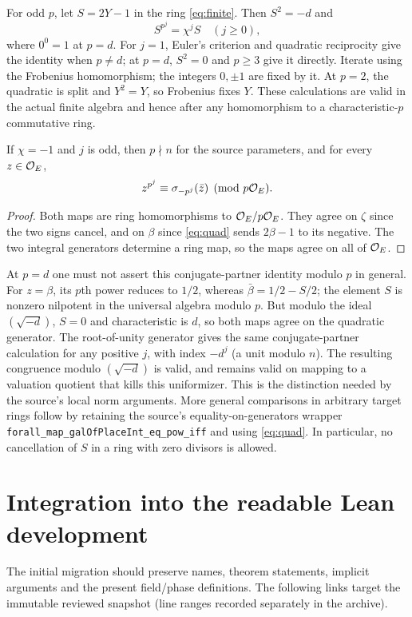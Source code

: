 \documentclass[11pt]{article}
\begin{document}
For odd $p$, let $S=2Y-1$ in the ring \eqref{eq:finite}. Then $S^2=-d$ and
\begin{equation}\label{eq:quad}
 S^{p^j}=\chi^j S\quad(j\ge0),
\end{equation}
where $0^0=1$ at $p=d$. For $j=1$, Euler's criterion and quadratic reciprocity give the identity when $p\ne d$; at $p=d$, $S^2=0$ and $p\ge3$ give it directly. Iterate using the Frobenius homomorphism; the integers $0,\pm1$ are fixed by it. At $p=2$, the quadratic is split and $Y^2=Y$, so Frobenius fixes $Y$. These calculations are valid in the actual finite algebra and hence after any homomorphism to a characteristic-$p$ commutative ring.

\begin{corollary}
If $\chi=-1$ and $j$ is odd, then $p\nmid n$ for the source parameters, and for every $z\in\mathcal O_E$,
\[
 z^{p^j}\equiv\sigma_{-p^j}(\bar z)\pmod{p\mathcal O_E}.
\]
\end{corollary}
\begin{proof}
Both maps are ring homomorphisms to $\mathcal O_E/p\mathcal O_E$. They agree on $\zeta$ since the two signs cancel, and on $\beta$ since \eqref{eq:quad} sends $2\beta-1$ to its negative. The two integral generators determine a ring map, so the maps agree on all of $\mathcal O_E$.
\end{proof}

At $p=d$ one must not assert this conjugate-partner identity modulo $p$ in general. For $z=\beta$, its $p$th power reduces to $1/2$, whereas $\bar\beta=1/2-S/2$; the element $S$ is nonzero nilpotent in the universal algebra modulo $p$. But modulo the ideal $(\sqrt{-d})$, $S=0$ and characteristic is $d$, so both maps agree on the quadratic generator. The root-of-unity generator gives the same conjugate-partner calculation for any positive $j$, with index $-d^j$ (a unit modulo $n$). The resulting congruence modulo $(\sqrt{-d})$ is valid, and remains valid on mapping to a valuation quotient that kills this uniformizer. This is the distinction needed by the source's local norm arguments. More general comparisons in arbitrary target rings follow by retaining the source's equality-on-generators wrapper \texttt{forall\_map\_galOfPlaceInt\_eq\_pow\_iff} and using \eqref{eq:quad}. In particular, no cancellation of $S$ in a ring with zero divisors is allowed.

\section{Integration into the readable Lean development}
\label{sec:integration}
The initial migration should preserve names, theorem statements, implicit arguments and the present field/phase definitions. The following links target the immutable reviewed snapshot (line ranges recorded separately in the archive).
\end{document}
